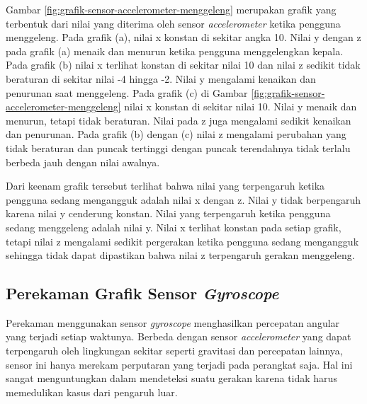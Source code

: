 Gambar \ref{fig:grafik-sensor-accelerometer-menggeleng} merupakan grafik yang terbentuk dari nilai yang diterima oleh sensor \textit{accelerometer} ketika pengguna menggeleng. Pada grafik (a), nilai x konstan di sekitar angka 10. Nilai y dengan z pada grafik (a) menaik dan menurun ketika pengguna menggelengkan kepala. Pada grafik (b) nilai x terlihat konstan di sekitar nilai 10 dan nilai z sedikit tidak beraturan di sekitar nilai -4 hingga -2. Nilai y mengalami kenaikan dan penurunan saat menggeleng. Pada grafik (c) di Gambar \ref{fig:grafik-sensor-accelerometer-menggeleng} nilai x konstan di sekitar nilai 10. Nilai y menaik dan menurun, tetapi tidak beraturan. Nilai pada z juga mengalami sedikit kenaikan dan penurunan. Pada grafik (b) dengan (c) nilai z mengalami perubahan yang tidak beraturan dan puncak tertinggi dengan puncak terendahnya tidak terlalu berbeda jauh dengan nilai awalnya.

Dari keenam grafik tersebut terlihat bahwa nilai yang terpengaruh ketika pengguna sedang mengangguk adalah nilai x dengan z. Nilai y tidak berpengaruh karena nilai y cenderung konstan. Nilai yang terpengaruh ketika pengguna sedang menggeleng adalah nilai y. Nilai x terlihat konstan pada setiap grafik, tetapi nilai z mengalami sedikit pergerakan ketika pengguna sedang mengangguk sehingga tidak dapat dipastikan bahwa nilai z terpengaruh gerakan menggeleng. 

\subsection{Perekaman Grafik Sensor \textit{Gyroscope}}
\label{sec:analisis_grafik_sensor_gyroscope}
Perekaman menggunakan sensor \textit{gyroscope} menghasilkan percepatan angular yang terjadi setiap waktunya. Berbeda dengan sensor \textit{accelerometer} yang dapat terpengaruh oleh lingkungan sekitar seperti gravitasi dan percepatan lainnya, sensor ini hanya merekam perputaran yang terjadi pada perangkat saja. Hal ini sangat menguntungkan dalam mendeteksi suatu gerakan karena tidak harus memedulikan kasus dari pengaruh luar. 


